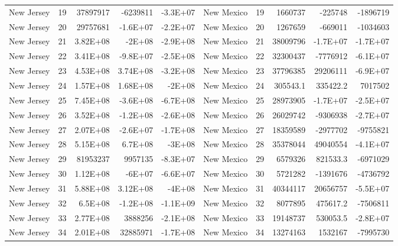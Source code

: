 \begin{landscape}
\begin{singlespace}
\begin{longtable}{lrrrr|lrrrr}
		New Jersey &  19 & 37897917 & -6239811 & -3.3E+07 & New Mexico &  19 & 1660737 & -225748 & -1896719 \\
		New Jersey &  20 & 29757681 & -1.6E+07 & -2.2E+07 & New Mexico &  20 & 1267659 & -669011 & -1034603 \\
		New Jersey &  21 & 3.82E+08 & -2E+08 & -2.9E+08 & New Mexico &  21 & 38009796 & -1.7E+07 & -1.7E+07 \\
		New Jersey &  22 & 3.41E+08 & -9.8E+07 & -2.5E+08 & New Mexico &  22 & 32300437 & -7776912 & -6.1E+07 \\
		New Jersey &  23 & 4.53E+08 & 3.74E+08 & -3.2E+08 & New Mexico &  23 & 37796385 & 29206111 & -6.9E+07 \\
		New Jersey &  24 & 1.57E+08 & 1.68E+08 & -2E+08 & New Mexico &  24 & 305543.1 & 335422.2 & 7017502 \\
		New Jersey &  25 & 7.45E+08 & -3.6E+08 & -6.7E+08 & New Mexico &  25 & 28973905 & -1.7E+07 & -2.5E+07 \\
		New Jersey &  26 & 3.52E+08 & -1.2E+08 & -2.6E+08 & New Mexico &  26 & 26029742 & -9306938 & -2.7E+07 \\
		New Jersey &  27 & 2.07E+08 & -2.6E+07 & -1.7E+08 & New Mexico &  27 & 18359589 & -2977702 & -9755821 \\
		New Jersey &  28 & 5.15E+08 & 6.7E+08 & -3E+08 & New Mexico &  28 & 35378044 & 49040554 & -4.1E+07 \\
		New Jersey &  29 & 81953237 & 9957135 & -8.3E+07 & New Mexico &  29 & 6579326 & 821533.3 & -6971029 \\
		New Jersey &  30 & 1.12E+08 & -6E+07 & -6.6E+07 & New Mexico &  30 & 5721282 & -1391676 & -4736792 \\
		New Jersey &  31 & 5.88E+08 & 3.12E+08 & -4E+08 & New Mexico &  31 & 40344117 & 20656757 & -5.5E+07 \\
		New Jersey &  32 & 6.5E+08 & -1.2E+08 & -1.1E+09 & New Mexico &  32 & 8077895 & 475617.2 & -7506811 \\
		New Jersey &  33 & 2.77E+08 & 3888256 & -2.1E+08 & New Mexico &  33 & 19148737 & 530053.5 & -2.8E+07 \\
		New Jersey &  34 & 2.01E+08 & 32885971 & -1.7E+08 & New Mexico &  34 & 13274163 & 1532167 & -7995730\\


\end{longtable}
\end{singlespace}
\end{landscape}
